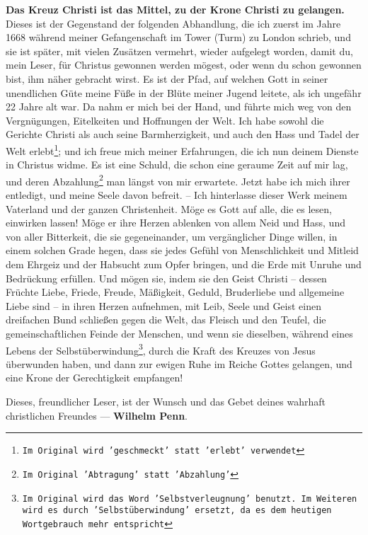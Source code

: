 \textbf{Das Kreuz Christi ist das Mittel, zu der Krone Christi zu gelangen.}
Dieses ist der Gegenstand der folgenden Abhandlung, die ich zuerst im Jahre 1668
während meiner Gefangenschaft  im Tower (Turm) zu London
 schrieb, und sie ist später, mit vielen Zusätzen vermehrt, wieder
aufgelegt worden, damit du, mein Leser, für Christus gewonnen werden mögest,
oder wenn du schon gewonnen bist, ihm näher gebracht wirst. Es ist der Pfad, auf
welchen Gott in seiner unendlichen Güte meine Füße in der Blüte meiner Jugend
leitete, als ich ungefähr 22 Jahre alt war. Da nahm er mich bei der Hand, und
führte mich weg von den Vergnügungen, Eitelkeiten und Hoffnungen der Welt. Ich
habe sowohl die Gerichte Christi als auch seine Barmherzigkeit, und auch den
Hass und Tadel der Welt erlebt\footnote{\texttt{Im Original wird 'geschmeckt'
statt 'erlebt' verwendet}}; und ich freue mich meiner Erfahrungen, die ich nun
deinem
Dienste in Christus widme. Es ist eine Schuld, die schon eine geraume Zeit auf
mir lag, und deren Abzahlung\footnote{\texttt{Im Original 'Abtragung' statt
'Abzahlung'}} man längst von mir erwartete. Jetzt habe ich mich ihrer
entledigt, und meine Seele davon befreit. -- Ich hinterlasse dieser Werk meinem
Vaterland und der ganzen Christenheit. Möge es Gott auf alle, die es lesen,
einwirken lassen! Möge er ihre Herzen ablenken von allem Neid und Hass, und von
aller Bitterkeit, die sie gegeneinander, um vergänglicher Dinge willen, in
einem solchen Grade hegen, dass sie jedes Gefühl von Menschlichkeit und Mitleid
dem Ehrgeiz und der Habsucht zum Opfer bringen, und die Erde mit Unruhe und
Bedrückung erfüllen. Und mögen sie, indem sie den Geist Christi -- dessen
Früchte Liebe, Friede, Freude, Mäßigkeit, Geduld, Bruderliebe und allgemeine
Liebe sind -- in ihren Herzen aufnehmen, mit Leib, Seele und Geist einen
dreifachen Bund schließen gegen die Welt, das Fleisch und den Teufel, die
gemeinschaftlichen Feinde der Menschen, und wenn sie dieselben, während eines
Lebens der Selbstüberwindung\footnote{\texttt{Im Original wird das Word
'Selbstverleugnung' benutzt. Im Weiteren wird es durch 'Selbstüberwindung'
ersetzt, da es dem heutigen Wortgebrauch mehr entspricht}}, durch die Kraft des
Kreuzes von Jesus überwunden haben, und dann zur ewigen Ruhe im Reiche Gottes
gelangen, und eine Krone der Gerechtigkeit empfangen!


\medskip

Dieses, freundlicher Leser, ist der Wunsch und das Gebet deines wahrhaft
christlichen Freundes --- \textbf{Wilhelm Penn}.



